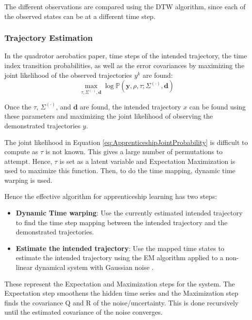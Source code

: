 \documentclass[hidelinks,BTech]{iitmdiss}
\begin{document}
The different observations are compared using the DTW\cite{DTW} algorithm, since each of the observed states can be at a different time step.


\subsubsection*{Trajectory Estimation}
In the quadrotor aerobatics paper, \cite{ApprenticeshipHelicopterAerobatics} time steps of the intended trajectory, the time index transition probabilities, as well as the error covariances by maximizing the joint likelihood of the observed trajectories $y^k$ are found:
\begin{equation} \label{eq:ApprenticeshipJointProbability}
  \max_{\tau, \Sigma^{(\cdot)}, \mathbf{d}} \log \mathbb{P}(\mathbf{y}, \rho, \tau ; \Sigma^{(\cdot)}, \mathbf{d})
\end{equation}

Once the $\tau$, $\Sigma^{(\cdot)}$, and $\mathbf{d}$ are found, the intended trajectory $x$ can be found using these parameters and maximizing the joint likelihood of observing the demonstrated trajectories $y$.

The joint likelihood in Equation \ref{eq:ApprenticeshipJointProbability} is difficult to compute as $\tau$ is not known. This gives a large number of permutations to attempt. Hence, $\tau$ is set as a latent variable and Expectation Maximization is used to maximize this function. Then, to do the time mapping, dynamic time warping \cite{DTW} is used.

Hence the effective algorithm for apprenticeship learning has two steps:
\begin{itemize}
\item{{\bf Dynamic Time warping}: Use the currently estimated intended trajectory to find the time step mapping between the intended trajectory and the demonstrated trajectories.}
\item{{\bf Estimate the intended trajectory}: Use the mapped time states to estimate the intended trajectory using the EM algorithm applied to a non-linear dynamical system with Gaussian noise \cite{NonLinearEMKalman}.}
\end{itemize}

These represent the Expectation and Maximization steps for the system. The Expectation step smoothens the hidden time series and the Maximization step finds the covariance Q and R of the noise/uncertainty. This is done recursively until the estimated covariance of the noise converges.
\end{document}
